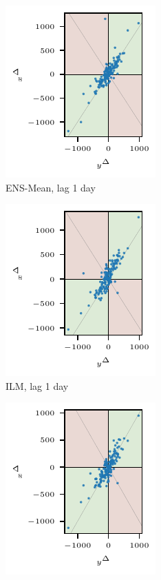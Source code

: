 \begin{figure}
\centering
\begin{subfigure}[t]{0.23\textwidth}
    \includegraphics{plots/covid_nowcast/30_ENS-MEAN_4q_lag_1}
    \caption{ENS-Mean, lag 1 day}\label{fig:app-covid-4q-ens-mean-1}
\end{subfigure}\hspace{0.01\textwidth}%
\begin{subfigure}[t]{0.23\textwidth}
    \includegraphics{plots/covid_nowcast/30_ILM_4q_lag_1}
    \caption{ILM, lag 1 day}\label{fig:app-covid-4q-ilm-1}
\end{subfigure}\hspace{0.01\textwidth}%
\begin{subfigure}[t]{0.23\textwidth}
    \includegraphics{plots/covid_nowcast/30_RIVM_4q_lag_1}

\end{subfigure}
\end{figure}
